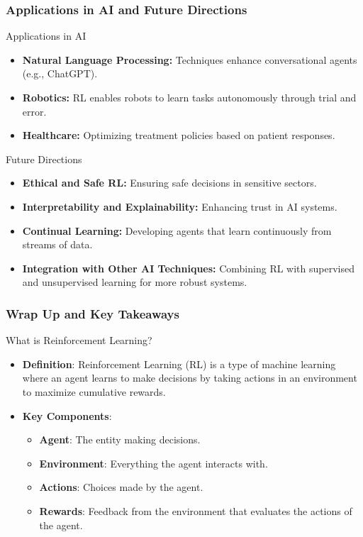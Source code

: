 \documentclass[aspectratio=169]{beamer}
\begin{document}
\begin{frame}[fragile]
    \frametitle{Applications in AI and Future Directions}
    \begin{block}{Applications in AI}
        \begin{itemize}
            \item \textbf{Natural Language Processing:}
                Techniques enhance conversational agents (e.g., ChatGPT).
            \item \textbf{Robotics:}
                RL enables robots to learn tasks autonomously through trial and error.
            \item \textbf{Healthcare:}
                Optimizing treatment policies based on patient responses.
        \end{itemize}
    \end{block}

    \begin{block}{Future Directions}
        \begin{itemize}
            \item \textbf{Ethical and Safe RL:}
                Ensuring safe decisions in sensitive sectors.
            \item \textbf{Interpretability and Explainability:}
                Enhancing trust in AI systems.
            \item \textbf{Continual Learning:}
                Developing agents that learn continuously from streams of data.
            \item \textbf{Integration with Other AI Techniques:}
                Combining RL with supervised and unsupervised learning for more robust systems.
        \end{itemize}
    \end{block}
\end{frame}

\begin{frame}[fragile]
    \frametitle{Wrap Up and Key Takeaways}
    \begin{block}{What is Reinforcement Learning?}
        \begin{itemize}
            \item \textbf{Definition}: Reinforcement Learning (RL) is a type of machine learning where an agent learns to make decisions by taking actions in an environment to maximize cumulative rewards.
            \item \textbf{Key Components}:
            \begin{itemize}
                \item \textbf{Agent}: The entity making decisions.
                \item \textbf{Environment}: Everything the agent interacts with.
                \item \textbf{Actions}: Choices made by the agent.
                \item \textbf{Rewards}: Feedback from the environment that evaluates the actions of the agent.
            \end{itemize}
        \end{itemize}
    \end{block}
\end{frame}
\end{document}
